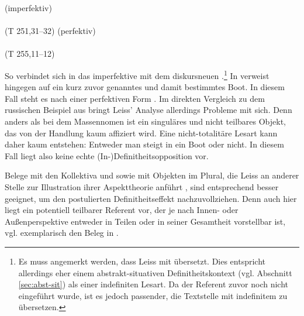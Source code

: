 \begin{exe}
	\ex \label{ex:gi-stigan}   
	\begin{xlist}
		\ex \label{ex:stigan}   (imperfektiv) \\ 
		 \\ (T 251,31--32)
		\ex \label{ex:gistigan}   (perfektiv) \\   \\ (T 255,11--12)
		\end{xlist}
\end{exe}
\noindent
So verbindet sich in  das imperfektive   mit dem diskursneuen .\footnote{Es muss angemerkt werden, dass Leiss  mit  übersetzt. Dies entspricht allerdings eher einem abstrakt-situativen Definitheitskontext (vgl. Abschnitt \ref{sec:abst-sit}) als einer indefiniten Lesart. Da der Referent zuvor noch nicht eingeführt wurde, ist es jedoch passender, die Textstelle mit indefinitem  zu übersetzen.} In  verweist  hingegen auf ein kurz zuvor genanntes und damit bestimmtes Boot. In diesem Fall steht es nach einer perfektiven Form .
Im direkten Vergleich zu dem russischen Beispiel aus  bringt Leiss' Analyse allerdings Probleme mit sich. Denn anders als bei dem Massennomen  ist  ein singuläres und nicht teilbares Objekt, das von der Handlung  kaum affiziert wird. Eine nicht-totalitäre Lesart kann daher kaum entstehen: Entweder man steigt in ein Boot oder nicht. In diesem Fall liegt also keine echte \mbox{(In-)}Definitheitsopposition vor. 

Belege mit den Kollektiva   und   sowie mit Objekten im Plural, die Leiss an anderer Stelle zur Illustration ihrer Aspekttheorie anführt \parencite[170ff.]{Leiss2000}, sind entsprechend besser geeignet, um den postulierten Definitheitseffekt nachzuvollziehen. Denn auch hier liegt ein potentiell teilbarer Referent vor, der je nach Innen- oder Außenperspektive entweder in Teilen oder in seiner Gesamtheit vorstellbar ist, vgl. exemplarisch den Beleg in  \parencite[170]{Leiss2000}. 


